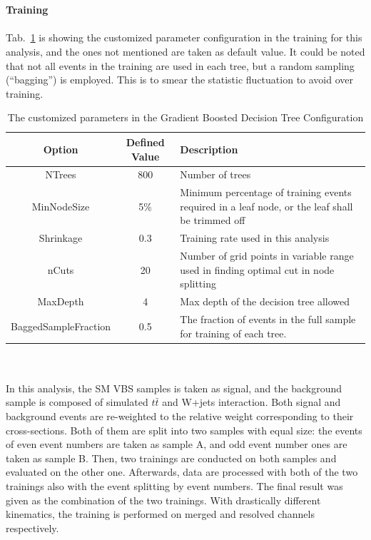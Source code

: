 \\
\\{\bf Training}
\\
\\Tab.~\ref{Tab:BDTG_config} is showing the customized parameter configuration in the training for this analysis, and the ones not mentioned are taken as default value. It could be noted that not all events in the training are used in each tree, but a random sampling (``bagging'') is employed. This is to smear the statistic fluctuation to avoid over training.
\begin{table}[t]
	\caption{The customized parameters in the Gradient Boosted Decision Tree Configuration } \label{Tab:BDTG_config}
	\begin{center}
			\begin{tabularx}{\textwidth}{|c|c|X|}
				\hline
				Option & Defined Value & Description \\
				\hline
				NTrees & 800 & Number of trees\\
				\hline
                MinNodeSize & 5\% & Minimum percentage of training events required in a leaf node, or the leaf shall be trimmed off \\
                \hline
                Shrinkage & 0.3 & Training rate used in this analysis \\
				\hline
                nCuts & 20 & Number of grid points in variable range used in finding optimal cut in node splitting\\
				\hline
				MaxDepth & 4 & Max depth of the decision tree allowed \\
				\hline 
				BaggedSampleFraction & 0.5 & The fraction of events in the full sample for training of each tree. \\
				\hline
			\end{tabularx}
	\end{center}
\end{table}
\noindent
\\
\\In this analysis, the SM VBS samples is taken as signal, and the background sample is composed of simulated $t\bar{t}$ and W+jets interaction. Both signal and background events are re-weighted to the relative weight corresponding to their cross-sections.  Both of them are split into two samples with equal size: the events of even event numbers are taken as sample A, and odd event number ones are taken as sample B. Then, two trainings are conducted on both samples and evaluated on the other one. Afterwards, data are processed with both of the two trainings also with the event splitting by event numbers. The final result was given as the combination of the two trainings. With drastically different kinematics, the training is performed on merged and resolved channels respectively. 
